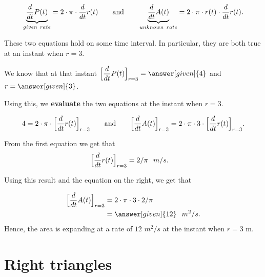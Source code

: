 \documentclass{ximera}
\begin{document}
\begin{example}
\begin{explanation}
    \[
  \underbrace{ \dfrac{d}{dt}P(t)}_{given\hspace{0.05in} rate} = 2\cdot \pi\cdot  \dfrac{d}{dt}r(t)
    \qquad\text{and}\qquad
    \underbrace{ \dfrac{d}{dt}A(t)}_{unknown \hspace{0.05in}rate} = 2\cdot \pi\cdot r(t) \cdot  \dfrac{d}{dt}r(t).
    \]
    
    These two equations hold on some time interval. In particular, they are both true at an instant when $r=3$.
    
   We know  that at that instant $\Bigl[ \dfrac{d}{dt}P(t)\Bigr]_{r=3} =
    \answer[given]{4}$ and $r = \answer[given]{3}$. 
    
    Using this, we \textbf{evaluate}  the two equations at the instant when $r=3$.
    
        \[
    4 = 2\cdot \pi\cdot \Bigl[\dfrac{d}{dt}r(t)\Bigr]_{r=3}
    \qquad\text{and}\qquad
   \Bigl[ \dfrac{d}{dt}A(t)\Bigr]_{r=3} = 2\cdot \pi\cdot 3 \cdot \Bigl[\dfrac{d}{dt}r(t)  \Bigl]_{r=3}.
    \]
    
    
   From the first equation we get that
    \begin{align*}
      \Bigl[\dfrac{d}{dt}r(t)\Bigr]_{r=3}&=  2/\pi \hspace{0.1in} m/s.    
    \end{align*} 
   
  Using this result and the equation on the right, we get that
   
    \begin{align*}
     \Bigl[ \dfrac{d}{dt}A(t)\Bigr]_{r=3} &= 2\cdot \pi\cdot 3 \cdot 2/\pi\\
      &=\answer[given]{12}\hspace{0.1in} m^2/s.
    \end{align*}
    Hence, the area is expanding at a rate of $12$ $m^2/s$ at the instant when $r=3$ m.
  \end{explanation}
\end{example}





\section{Right triangles}
\end{document}
